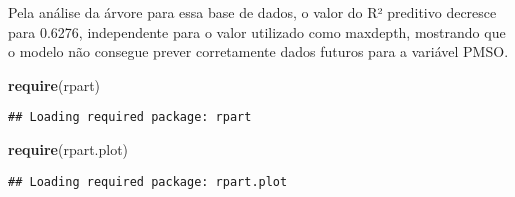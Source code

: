 \documentclass[
]{article}
\newenvironment{Shaded}{\begin{snugshade}}{\end{snugshade}}
\newcommand{\ControlFlowTok}[1]{\textcolor[rgb]{0.13,0.29,0.53}{\textbf{#1}}}
\newcommand{\DataTypeTok}[1]{\textcolor[rgb]{0.13,0.29,0.53}{#1}}
\newcommand{\DecValTok}[1]{\textcolor[rgb]{0.00,0.00,0.81}{#1}}
\newcommand{\KeywordTok}[1]{\textcolor[rgb]{0.13,0.29,0.53}{\textbf{#1}}}
\newcommand{\NormalTok}[1]{#1}
\newcommand{\OperatorTok}[1]{\textcolor[rgb]{0.81,0.36,0.00}{\textbf{#1}}}
\newcommand{\OtherTok}[1]{\textcolor[rgb]{0.56,0.35,0.01}{#1}}
\newcommand{\StringTok}[1]{\textcolor[rgb]{0.31,0.60,0.02}{#1}}
\begin{document}
Pela análise da árvore para essa base de dados, o valor do R² preditivo
decresce para 0.6276, independente para o valor utilizado como maxdepth,
mostrando que o modelo não consegue prever corretamente dados futuros
para a variável PMSO.

\begin{Shaded}
\begin{Highlighting}[]
\KeywordTok{require}\NormalTok{(rpart)}
\end{Highlighting}
\end{Shaded}

\begin{verbatim}
## Loading required package: rpart
\end{verbatim}

\begin{Shaded}
\begin{Highlighting}[]
\KeywordTok{require}\NormalTok{(rpart.plot)}
\end{Highlighting}
\end{Shaded}

\begin{verbatim}
## Loading required package: rpart.plot
\end{verbatim}

\begin{Shaded}
\end{Shaded}
\end{document}

